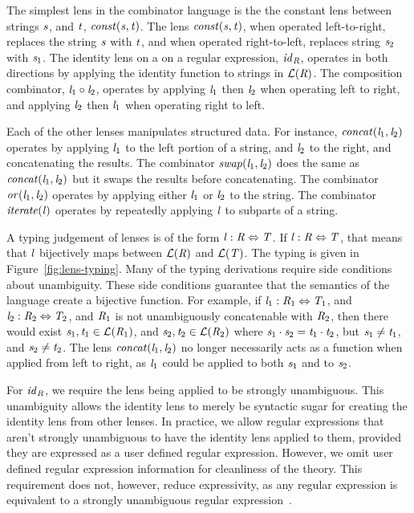 \documentclass[numbers,10pt,preprint\ifanon ,nocopyrightspace\fi]{sigplanconf}
\begin{document}
The simplest lens in the combinator language is the the constant lens between
strings $\mathit{s}$, and $\mathit{t}$, $\mathit{const}(\mathit{s},\mathit{t})$.
The lens $\mathit{const}(\mathit{s},\mathit{t})$, when operated left-to-right,
replaces the string $\mathit{s}$ with $\mathit{t}$, and when operated
right-to-left, replaces string $\mathit{s}_2$ with $\mathit{s}_1$.  The identity lens
on a on a regular expression, $\mathit{id}_{\mathit{R}}$, operates in both
directions by applying the
identity function to strings in $\mathcal{L}(\mathit{R})$.  The composition
combinator, 
$\mathit{l}_1 \circ \mathit{l}_2$, operates by applying $\mathit{l}_1$ then $\mathit{l}_2$
when operating left to right, and applying $\mathit{l}_2$ then $\mathit{l}_1$ when
operating right to left.

Each of the other lenses manipulates structured data.  For instance,
$\mathit{concat}(\mathit{l}_1,\mathit{l}_2)$ operates by applying $\mathit{l}_1$ to the left
portion of a string, and $\mathit{l}_2$ to the right, and concatenating the results.
The combinator
$\mathit{swap}(\mathit{l}_1,\mathit{l}_2)$ does the same as $\mathit{concat}(\mathit{l}_1,\mathit{l}_2)$
but it swaps the results before concatenating.
The combinator $\mathit{or}(\mathit{l}_1,\mathit{l}_2)$ operates by applying either $\mathit{l}_1$ or $\mathit{l}_2$
to the string.  The combinator $\mathit{\mathit{iterate}(\mathit{l})}$ operates by repeatedly
applying $\mathit{l}$ to subparts of a string.

A typing judgement of lenses is of the form $\mathit{l} : \mathit{R}
\Leftrightarrow \mathit{T}$.  If $\mathit{l} : \mathit{R} \Leftrightarrow
\mathit{T}$, that means that $\mathit{l}$ bijectively maps between
$\mathcal{L}(\mathit{R})$ and $\mathcal{L}(\mathit{T})$.  The typing is given in
Figure~\ref{fig:lens-typing}.  Many of the typing derivations require side
conditions about
unambiguity.  These side conditions guarantee that the semantics of the language
create a bijective function.  For example, if $\mathit{l}_1 : \mathit{R}_1
\Leftrightarrow \mathit{T}_1$, and $\mathit{l}_2 : \mathit{R}_2 \Leftrightarrow
\mathit{T}_2$, and $\mathit{R}_1$ is not unambiguously concatenable with $\mathit{R}_2$,
then there would exist $\mathit{s}_1,\mathit{t}_1\in\mathcal{L}(\mathit{R}_1)$, and
$\mathit{s}_2,\mathit{t}_2\in\mathcal{L}(\mathit{R}_2)$ where
$\mathit{s}_1\cdot\mathit{s}_2 = \mathit{t}_1\cdot\mathit{t}_2$, but $\mathit{s}_1
\neq \mathit{t}_1$, and $\mathit{s}_2 \neq \mathit{t}_2$.  The lens
$\mathit{concat}(\mathit{l}_1,\mathit{l}_2)$ no longer necessarily acts as a function
when applied from left to right, as
$\mathit{l}_1$ could be applied to both $\mathit{s}_1$ and to $\mathit{s}_2$.

For $\mathit{id}_{\mathit{R}}$, we require the lens being applied to be strongly
unambiguous.  This unambiguity allows the identity lens to merely be syntactic sugar for
creating the identity lens from other lenses.  In practice, we allow regular
expressions that aren't strongly unambiguous to have the identity lens applied to
them, provided they are expressed as a user defined regular expression.
However, we omit user defined regular expression information for cleanliness of
the theory.  This requirement does not, however, reduce expressivity, as any regular
expression is equivalent to a strongly unambiguous regular
expression~\cite{unambigregex}.
\end{document}
